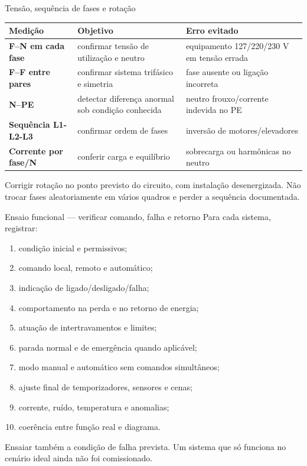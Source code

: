 \begin{frame}{Tensão, sequência de fases e rotação}
\scriptsize
\begin{tabularx}{\textwidth}{>{\bfseries}p{2.7cm}X X}
\toprule
Medição & Objetivo & Erro evitado \\
\midrule
F--N em cada fase & confirmar tensão de utilização e neutro & equipamento 127/220/230 V em tensão errada \\
F--F entre pares & confirmar sistema trifásico e simetria & fase ausente ou ligação incorreta \\
N--PE & detectar diferença anormal sob condição conhecida & neutro frouxo/corrente indevida no PE \\
Sequência L1-L2-L3 & confirmar ordem de fases & inversão de motores/elevadores \\
Corrente por fase/N & conferir carga e equilíbrio & sobrecarga ou harmônicas no neutro \\
\bottomrule
\end{tabularx}
\begin{caixaAt}
Corrigir rotação no ponto previsto do circuito, com instalação desenergizada. Não trocar fases aleatoriamente em vários quadros e perder a sequência documentada.
\end{caixaAt}
\end{frame}

\begin{frame}{Ensaio funcional — verificar comando, falha e retorno}
\scriptsize
Para cada sistema, registrar:
\begin{enumerate}
\item condição inicial e permissivos;
\item comando local, remoto e automático;
\item indicação de ligado/desligado/falha;
\item comportamento na perda e no retorno de energia;
\item atuação de intertravamentos e limites;
\item parada normal e de emergência quando aplicável;
\item modo manual e automático sem comandos simultâneos;
\item ajuste final de temporizadores, sensores e cenas;
\item corrente, ruído, temperatura e anomalias;
\item coerência entre função real e diagrama.
\end{enumerate}
\begin{caixaObs}
Ensaiar também a condição de falha prevista. Um sistema que só funciona no cenário ideal ainda não foi comissionado.
\end{caixaObs}
\end{frame}

